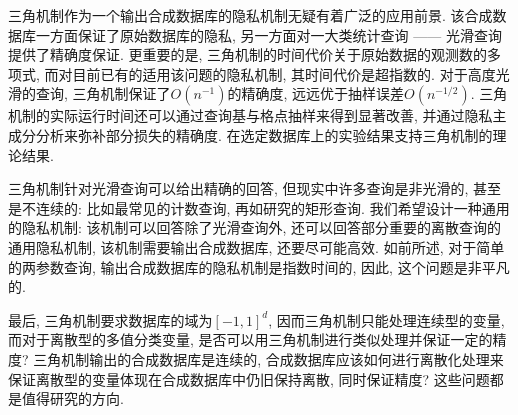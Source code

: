 三角机制作为一个输出合成数据库的隐私机制无疑有着广泛的应用前景. 该合成数据库一方面保证了原始数据库的隐私, 另一方面对一大类统计查询 ------ 光滑查询提供了精确度保证. 更重要的是, 三角机制的时间代价关于原始数据的观测数的多项式, 而对目前已有的适用该问题的隐私机制, 其时间代价是超指数的. 对于高度光滑的查询, 三角机制保证了$O(n^{-1})$的精确度, 远远优于抽样误差$O\left(n^{-1/2}\right)$. 三角机制的实际运行时间还可以通过查询基与格点抽样来得到显著改善, 并通过隐私主成分分析来弥补部分损失的精确度. 在选定数据库上的实验结果支持三角机制的理论结果.

三角机制针对光滑查询可以给出精确的回答, 但现实中许多查询是非光滑的, 甚至是不连续的: 比如最常见的计数查询, 再如\parencite{blum2013learning}研究的矩形查询. 我们希望设计一种通用的隐私机制: 该机制可以回答除了光滑查询外, 还可以回答部分重要的离散查询的通用隐私机制, 该机制需要输出合成数据库, 还要尽可能高效. 如前所述, 对于简单的两参数查询, 输出合成数据库的隐私机制是指数时间的\parencite{ullman2011pcps}, 因此, 这个问题是非平凡的. 

最后, 三角机制要求数据库的域为$[-1, 1]^d$, 因而三角机制只能处理连续型的变量, 而对于离散型的多值分类变量, 是否可以用三角机制进行类似处理并保证一定的精度? 三角机制输出的合成数据库是连续的, 合成数据库应该如何进行离散化处理来保证离散型的变量体现在合成数据库中仍旧保持离散, 同时保证精度? 这些问题都是值得研究的方向. 